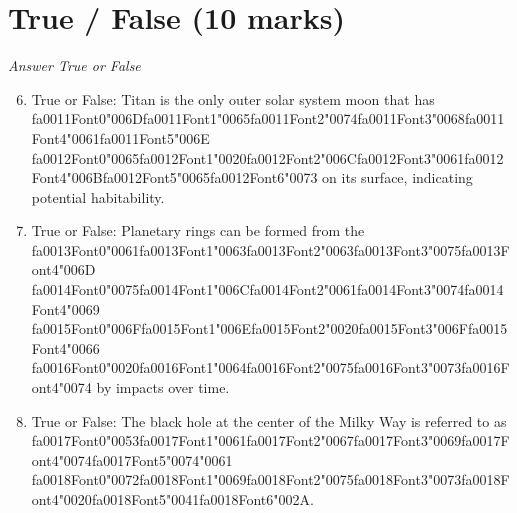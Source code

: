\documentclass[12pt]{article}
\begin{document}
\section*{True / False (10 marks)}
\textit{Answer True or False}
\begin{enumerate}[label=\arabic*.]
\setcounter{enumi}{5}
\item True or False: Titan is the only outer solar system moon that has {\csname fa0011Font0\endcsname\char"006D}{\csname fa0011Font1\endcsname\char"0065}{\csname fa0011Font2\endcsname\char"0074}{\csname fa0011Font3\endcsname\char"0068}{\csname fa0011Font4\endcsname\char"0061}{\csname fa0011Font5\endcsname\char"006E} {\csname fa0012Font0\endcsname\char"0065}{\csname fa0012Font1\endcsname\char"0020}{\csname fa0012Font2\endcsname\char"006C}{\csname fa0012Font3\endcsname\char"0061}{\csname fa0012Font4\endcsname\char"006B}{\csname fa0012Font5\endcsname\char"0065}{\csname fa0012Font6\endcsname\char"0073} on its surface, indicating potential habitability.
\item True or False: Planetary rings can be formed from the {\csname fa0013Font0\endcsname\char"0061}{\csname fa0013Font1\endcsname\char"0063}{\csname fa0013Font2\endcsname\char"0063}{\csname fa0013Font3\endcsname\char"0075}{\csname fa0013Font4\endcsname\char"006D} {\csname fa0014Font0\endcsname\char"0075}{\csname fa0014Font1\endcsname\char"006C}{\csname fa0014Font2\endcsname\char"0061}{\csname fa0014Font3\endcsname\char"0074}{\csname fa0014Font4\endcsname\char"0069} {\csname fa0015Font0\endcsname\char"006F}{\csname fa0015Font1\endcsname\char"006E}{\csname fa0015Font2\endcsname\char"0020}{\csname fa0015Font3\endcsname\char"006F}{\csname fa0015Font4\endcsname\char"0066} {\csname fa0016Font0\endcsname\char"0020}{\csname fa0016Font1\endcsname\char"0064}{\csname fa0016Font2\endcsname\char"0075}{\csname fa0016Font3\endcsname\char"0073}{\csname fa0016Font4\endcsname\char"0074} by impacts over time.
\item True or False: The black hole at the center of the Milky Way is referred to as {\csname fa0017Font0\endcsname\char"0053}{\csname fa0017Font1\endcsname\char"0061}{\csname fa0017Font2\endcsname\char"0067}{\csname fa0017Font3\endcsname\char"0069}{\csname fa0017Font4\endcsname\char"0074}{\csname fa0017Font5\endcsname\char"0074}{\char"0061} {\csname fa0018Font0\endcsname\char"0072}{\csname fa0018Font1\endcsname\char"0069}{\csname fa0018Font2\endcsname\char"0075}{\csname fa0018Font3\endcsname\char"0073}{\csname fa0018Font4\endcsname\char"0020}{\csname fa0018Font5\endcsname\char"0041}{\csname fa0018Font6\endcsname\char"002A}.

\end{enumerate}
\end{document}
